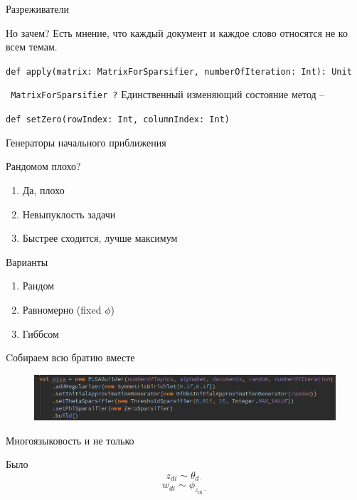 \documentclass{beamer}
\begin{document}
\begin{frame}{Разреживатели}
\begin{block}{Но зачем?}
Есть мнение, что каждый документ и каждое слово относятся не ко всем темам.

\texttt{def apply(matrix: MatrixForSparsifier, numberOfIteration: Int): Unit}
\end{block}

\begin{block}{\texttt{ MatrixForSparsifier ?}}
Единственный изменяющий состояние метод -- 

\texttt{def setZero(rowIndex: Int, columnIndex: Int)}
\end{block}
\end{frame}

\begin{frame}{ Генераторы начального приближения}
\begin{block}{Рандомом плохо?}
\begin{enumerate}
\item Да, плохо
\item Невыпуклость задачи
\item Быстрее сходится, лучше максимум
\end{enumerate}
\end{block}

\begin{block}{Варианты}
\begin{enumerate}
\item Рандом
\item Равномерно (fixed $\phi$)
\item Гиббсом
\end{enumerate}
\end{block}
\end{frame}


\begin{frame}{Cобираем всю братию вместе}

\begin{figure}[ht!]
\centering
\includegraphics[width=115mm]{builderConfugration.png}
\label{overflow}
\end{figure}

\end{frame}



\begin{frame}{Многоязыковость и не только}
\begin{block}{Было}
$$z_{di} \sim \theta_{d \cdot}$$
$$w_{di} \sim \phi_{z_{di} \cdot }$$
\end{block}

\end{frame}
\end{document}
